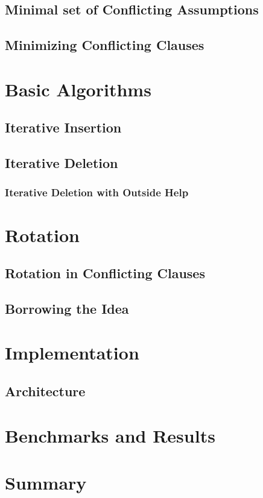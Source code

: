 \documentclass[]{article}
\begin{document}
\subsection{Minimal set of Conflicting Assumptions}
\subsection[Similar Problem]{Minimizing Conflicting Clauses}

\section{Basic Algorithms}
\subsection{Iterative Insertion}
\subsection{Iterative Deletion}
\subsubsection{Iterative Deletion with Outside Help}

\section{Rotation}
\subsection{Rotation in Conflicting Clauses}
\subsection{Borrowing the Idea}

\section{Implementation}
\subsection{Architecture}

\section{Benchmarks and Results}

\section{Summary}
\end{document}
